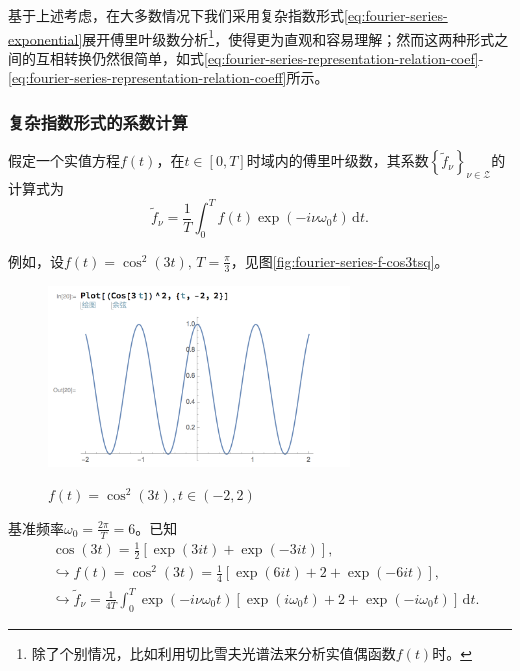 基于上述考虑，在大多数情况下我们采用复杂指数形式\eqref{eq:fourier-series-exponential}展开傅里叶级数分析\footnote{除了个别情况，比如利用切比雪夫光谱法来分析实值偶函数$f(t)$时。}，使得更为直观和容易理解；然而这两种形式之间的互相转换仍然很简单，如式\eqref{eq:fourier-series-representation-relation-coef}-\eqref{eq:fourier-series-representation-relation-coeff}所示。

\subsubsection{复杂指数形式的系数计算}
\label{sec:fourier-series-expo-coef}
假定一个实值方程$f(t)$，在$t \in [0,T]$时域内的傅里叶级数，其系数$\left\{ \tilde{f}_{\nu} \right\}_{\nu \in \mathcal{Z}}$的计算式为
\begin{equation*}
  \tilde{f}_{\nu} = \frac{1}{T} \int_{0}^{T} f(t) \exp \left( - i \nu \omega_{0} t \right) \, \mathrm{d} t.
\end{equation*}

例如，设$f(t) = \cos^{2} \left( 3 t \right), \, T = \frac{\pi}{3}$，见图\eqref{fig:fourier-series-f-cos3tsq}。

\begin{figure}[htbp]
   \caption{$f(t) = \cos^{2} \left( 3 t \right), t \in (-2, 2)$}
  \centering
  \includegraphics[width=8cm]{./Figures/20180305-cos3tsq.png}
  \label{fig:fourier-series-f-cos3tsq}
%
\end{figure}

基准频率$\omega_{0} = \frac{2 \pi}{T} = 6$。已知
\begin{equation}
  \label{eq:fourier-series-expo-coef}
\begin{split}
  & \cos \left( 3t \right) = \frac{1}{2} \left[
  \exp \left( 3 i t \right) + \exp \left( - 3 i t \right)
  \right], \\
  & \hookrightarrow
  f(t) = \cos^{2} (3t) = \frac{1}{4} \left[
  \exp \left( 6 i t \right) + 2 + \exp \left( - 6 i t \right)
  \right], \\
  & \hookrightarrow
  \tilde{f}_{\nu} = \frac{1}{4 T} \int_{0}^{T}
  \exp \left( -i \nu \omega_{0} t \right)
  \left[
  \exp \left( i \omega_{0} t \right) + 2
  + \exp \left( - i \omega_{0} t \right)
  \right] \, \mathrm{d} t.
\end{split}
\end{equation}

